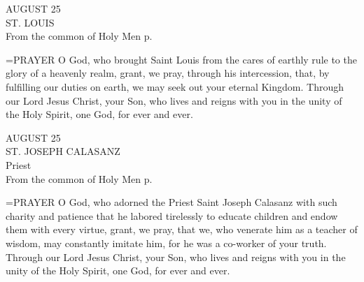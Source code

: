 \begin{center}\normalsize AUGUST 25\\
\footnotesize ST. LOUIS\\
\footnotesize From the common of Holy Men p. \\
\end{center}

\hangindent=\parindent \small{PRAYER 
O God, who brought Saint Louis
from the cares of earthly rule
to the glory of a heavenly realm,
grant, we pray, through his intercession,
that, by fulfilling our duties on earth,
we may seek out your eternal Kingdom.
Through our Lord Jesus Christ, your Son,
who lives and reigns with you in the unity of the Holy Spirit,
one God, for ever and ever.\\}
 
\begin{center}\normalsize AUGUST 25\\
\footnotesize ST. JOSEPH CALASANZ\\
\footnotesize Priest\\
\footnotesize From the common of Holy Men p. \\
\end{center}

\hangindent=\parindent \small{PRAYER 
O God, who adorned the Priest Saint Joseph Calasanz
with such charity and patience
that he labored tirelessly
to educate children and endow them with every virtue,
grant, we pray, that we, who venerate him as a teacher of wisdom,
may constantly imitate him,
for he was a co-worker of your truth.
Through our Lord Jesus Christ, your Son,
who lives and reigns with you in the unity of the Holy Spirit,
one God, for ever and ever.\\}
 
